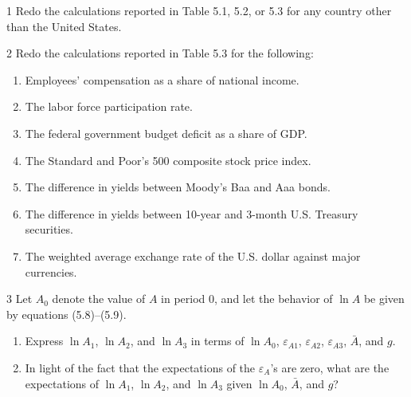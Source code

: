 

\begin{problem}{1}
Redo the calculations reported in Table 5.1, 5.2, or 5.3 for any country other than the United States.
\end{problem}

\begin{problem}{2}
Redo the calculations reported in Table 5.3 for the following:
\begin{enumerate}[label=(\alph*)]
    \item Employees' compensation as a share of national income.
    \item The labor force participation rate.
    \item The federal government budget deficit as a share of GDP.
    \item The Standard and Poor's 500 composite stock price index.
    \item The difference in yields between Moody's Baa and Aaa bonds.
    \item The difference in yields between 10-year and 3-month U.S. Treasury securities.
    \item The weighted average exchange rate of the U.S. dollar against major currencies.
\end{enumerate}
\end{problem}

\begin{problem}{3}
Let \(A_0\) denote the value of \(A\) in period 0, and let the behavior of \(\ln A\) be given by equations (5.8)--(5.9).
\begin{enumerate}[label=(\alph*)]
    \item Express \(\ln A_1\), \(\ln A_2\), and \(\ln A_3\) in terms of \(\ln A_0\), \(\varepsilon_{A1}\), \(\varepsilon_{A2}\), \(\varepsilon_{A3}\), \(\bar{A}\), and \(g\).
    \item In light of the fact that the expectations of the \(\varepsilon_A\)'s are zero, what are the expectations of \(\ln A_1\), \(\ln A_2\), and \(\ln A_3\) given \(\ln A_0\), \(\bar{A}\), and \(g\)?
\end{enumerate}
\end{problem}

